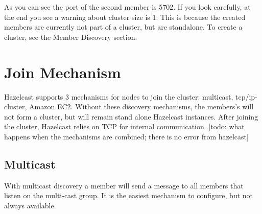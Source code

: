 As you can see the port of the second member is 5702. If you look carefully, at the end you see a warning about cluster size is 1. This is because the created members are currently not part of a cluster, but are standalone. To create a cluster, see the Member Discovery section.

\section{Join Mechanism }
Hazelcast supports 3 mechanisms for nodes to join the cluster: multicast, tcp/ip-cluster, Amazon EC2. Without these discovery mechanisms, the members's will not form a cluster, but will remain stand alone Hazelcast instances. After joining the cluster, Hazelcast relies on TCP for internal communication. [todo: what happens when the mechanisms are combined; there is no error from hazelcast]

\subsection{Multicast}
With multicast discovery a member will send a message to all members that listen on the multi-cast group. It is the easiest mechanism to configure, but not always available. 

